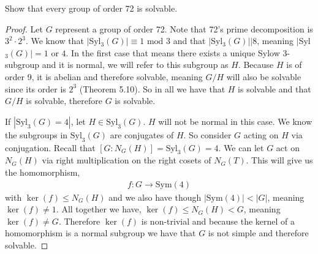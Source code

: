 \documentclass[11pt]{article}
\newenvironment{problem}[2][Problem\!]{\begin{trivlist}
\item[\hskip \labelsep {\bfseries #1}\hskip \labelsep {\bfseries #2}]}{\end{trivlist}}
\newcommand{\ord}[1]{{\left|#1\right|}}
\renewcommand{\leq}{\leqslant}
\begin{document}
\begin{tcolorbox}
  \begin{problem} {6.4}
    Show that every group of order 72 is solvable. 
  \end{problem}
\end{tcolorbox}
\begin{proof}
  Let $G$ represent a group of order 72. Note that 72's prime decomposition is $3^{2}\cdot 2^{3}$. We know that $|$Syl$_3(G)| \equiv 1 \text{ mod } 3$ and that $|$Syl$_3(G)| \mid 8$, meaning $|$Syl$_3(G)|= 1$ or $4$. In the first case that means there exists a unique Sylow $3$-subgroup and it is normal, we will refer to this subgroup as $H$. Because $H$ is of order 9, it is abelian and therefore solvable, meaning $G/H$ will also be solvable since its order is $2^{3}$ (Theorem 5.10). So in all we have that $H$ is solvable and that $G/H$ is solvable, therefore $G$ is solvable.

  If $\ord{\text{Syl}_3(G) = 4}$, let $H \in \text{Syl}_3(G)$. $H$ will not be normal in this case. We know the subgroups in $\text{Syl}_3(G)$ are conjugates of $H$. So consider $G$ acting on $H$ via conjugation. Recall that $[G : N_G(H)] = \text{Syl}_3(G) = 4$. We can let $G$ act on $N_G(H)$ via right multiplication on the right cosets of $N_G(T)$. This will give us the homomorphism, 
  \begin{align*}
    f:G \to \text{Sym}(4)
  \end{align*} 
  with $\ker{(f)} \leq N_G(H)$ and we also have though $\ord{\text{Sym}(4)} < \ord{G}$, meaning $\ker{(f)} \neq 1$. All together we have, $\ker{(f)} \leq N_G(H) < G$, meaning $\ker{(f)} \neq G$. Therefore $\ker{(f)}$ is non-trivial and because the kernel of a homomorphism is a normal subgroup we have that $G$ is not simple and therefore solvable. 
\end{proof}
\end{document}
